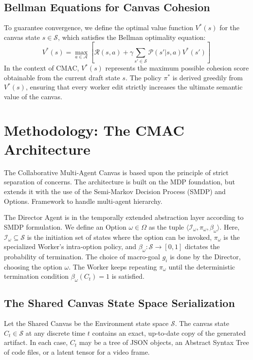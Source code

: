 \documentclass[pdflatex,sn-mathphys-num]{sn-jnl}
\begin{document}
\subsection{Bellman Equations for Canvas Cohesion}
To guarantee convergence, we define the optimal value function $V^*(s)$ for the canvas state $s \in \mathcal{S}$, which satisfies the Bellman optimality equation:
\begin{equation}
V^*(s) = \max_{a \in \mathcal{A}} \left[ \mathcal{R}(s, a) + \gamma \sum_{s' \in \mathcal{S}} \mathcal{P}(s' | s, a) V^*(s') \right]
\end{equation}
In the context of CMAC, $V^*(s)$ represents the maximum possible cohesion score obtainable from the current draft state $s$. The policy $\pi^*$ is derived greedily from $V^*(s)$, ensuring that every worker edit strictly increases the ultimate semantic value of the canvas.

\section{Methodology: The CMAC Architecture}

The Collaborative Multi-Agent Canvas is based upon the principle of strict separation of concerns. The architecture is built on the MDP foundation, but extends it with the use of the Semi-Markov Decision Process (SMDP) and Options. Framework to handle multi-agent hierarchy. 

The Director Agent is in the temporally extended abstraction layer according to SMDP formulation. We define an Option $\omega \in \Omega$ as the tuple $\langle \mathcal{I}_\omega, \pi_\omega, \beta_\omega \rangle$. Here, $\mathcal{I}_\omega \subseteq \mathcal{S}$ is the initiation set of states where the option can be invoked, $\pi_\omega$ is the specialized Worker's intra-option policy, and $\beta_\omega: \mathcal{S} \rightarrow [0, 1]$ dictates the probability of termination. The choice of macro-goal $g_i$ is done by the Director, choosing the option $\omega$. The Worker keeps repeating $\pi_\omega$ until the deterministic termination condition $\beta_\omega(C_t) = 1$ is satisfied.

\subsection{The Shared Canvas State Space Serialization}
Let the Shared Canvas be the Environment state space $\mathcal{S}$. The canvas state $C_t \in \mathcal{S}$ at any discrete time $t$ contains an exact, up-to-date copy of the generated artifact. In each case, $C_t$ may be a tree of JSON objects, an Abstract Syntax Tree of code files, or a latent tensor for a video frame.
\end{document}
